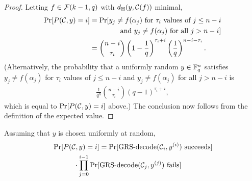 \documentclass[conference]{IEEEtran}
\begin{document}
{\begin{proof}
    Letting $f \in {\mathcal F}(k - 1, q)$ with $d_{{\rm H}}(y, {\mathcal C}(f))$ minimal, 
    \begin{align*}
        \Pr[P(\CC, y) = i] 
        &= \Pr[y_{j} \neq f(\alpha_{j}) \hbox{ for $\tau_{i}$ values of } j \le n - i \\ 
        & \hspace{1.5cm}\hbox{and }  y_{j} \neq f(\alpha_{j})
        \hbox{ for all $j > n - i$}
        ] \\ 
        &= %
        \binom{n - i}{\tau_{i}} 
        \left(1 - \frac{1}{q}\right)^{\tau_{i} + i} 
        \left(\frac{1}{q}\right)^{n - i - \tau_{i}}. 
    \end{align*}
    (Alternatively, 
    the probability that a uniformly random $y \in {\mathbb F}_{q}^{n}$ satisfies $y_{j} \neq f(\alpha_{j})$ for $\tau_{i}$ values of $j \le n - i$ and $y_{j} \neq f(\alpha_{j})$ for all $j > n - i$ is 
    \begin{align*}
        \frac{1}{q^{n}}
        \binom{n - i}{\tau_{i}} 
        (q - 1)^{\tau_{i} + i}, 
    \end{align*}
    which is equal to $\Pr[P({\mathcal C}, y) = i]$ above.) 
    The conclusion now follows from the definition of the expected value. 
\end{proof}
Assuming that $y$ is chosen uniformly at random, 
\begin{align*}
    &\Pr[P(\CC, y) = i] 
    = \Pr[\GRSdecode(\CC_{i}, y^{(i)})\ {\rm succeeds}] \\ 
    &\qquad\quad \cdot \prod_{j = 0}^{i - 1} \Pr[\GRSdecode(\CC_{j}, y^{(j)})\ {\rm fails}] \\

\end{align*}}
\end{document}
